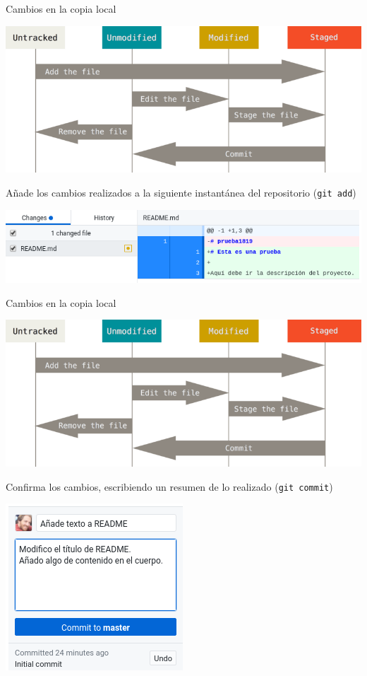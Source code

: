 \documentclass[aspectratio=169, xcolor={usenames,svgnames,dvipsnames}]{beamer}
\begin{document}
\begin{frame}[label={sec:org280c83c},fragile]{Cambios en la copia local}
 \begin{center}
\includegraphics[height=0.4\textheight]{figs/git_estados.png}
\end{center}

\alert{Añade los cambios} realizados a la siguiente \guillemotleft{}instantánea\guillemotright{} del repositorio (\texttt{git add}) \begin{center}
\includegraphics[width=.9\linewidth]{figs/git_add.png}
\end{center}
\end{frame}
\begin{frame}[label={sec:orgc3a24a3},fragile]{Cambios en la copia local}
 \begin{center}
\includegraphics[height=0.4\textheight]{figs/git_estados.png}
\end{center}

\alert{Confirma} los cambios, escribiendo un resumen de lo realizado (\texttt{git commit})
\begin{center}
\includegraphics[height=0.3\textheight]{figs/git_commit.png}
\end{center}
\end{frame}
\end{document}
